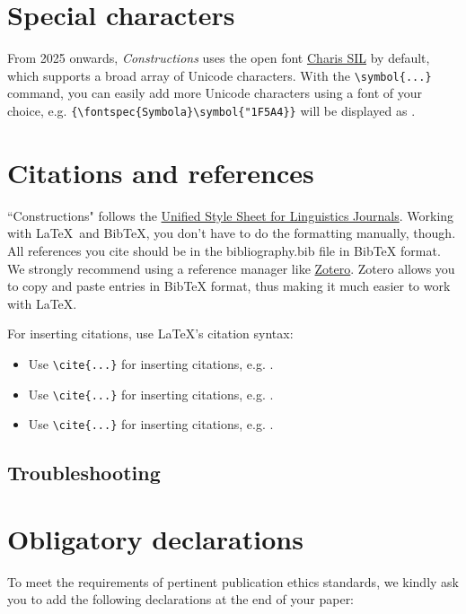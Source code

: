 \normalfont

\section{Special characters}

From 2025 onwards, \textit{Constructions} uses the open font \href{https://software.sil.org/charis/}{Charis SIL} by default, which supports a broad array of Unicode characters. With the \verb!\symbol{...}! command, you can easily add more Unicode characters using a font of your choice, e.g. \verb!{\fontspec{Symbola}\symbol{"1F5A4}}! will be displayed as {}. 

\section{Citations and references}

``Constructions" follows the \href{https://www.linguisticsociety.org/resource/unified-style-sheet}{Unified Style Sheet for Linguistics Journals}. Working with \LaTeX \  and BibTeX, you don't have to do the formatting manually, though. All references you cite should be in the bibliography.bib file in BibTeX format. We strongly recommend using a reference manager like \href{https://www.zotero.org/}{Zotero}. Zotero allows you to copy and paste entries in BibTeX format, thus making it much easier to work with \LaTeX. 

For inserting citations, use \LaTeX's citation syntax:

\begin{itemize}
    \item Use \verb!\cite{...}! for inserting citations, e.g. \cite{Example1}.
    \item Use \verb!\cite{...}! for inserting citations, e.g. \cite{Example2}.
    \item Use \verb!\cite{...}! for inserting citations, e.g. \cite{Example3}.
\end{itemize}

\subsection*{Troubleshooting}


\section*{Obligatory declarations}

To meet the requirements of pertinent publication ethics standards, we kindly ask you to add the following declarations at the end of your paper:


